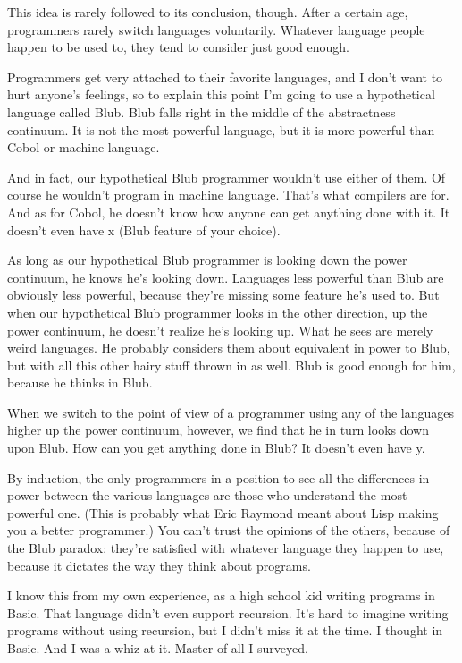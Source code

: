 \documentclass[10pt,twoside,openright]{memoir}
\begin{document}
This idea is rarely followed to its conclusion, though. After a certain age, programmers rarely switch languages voluntarily. Whatever language people happen to be used to, they tend to consider just good enough.

Programmers get very attached to their favorite languages, and I don't want to hurt anyone's feelings, so to explain this point I'm going to use a hypothetical language called Blub. Blub falls right in the middle of the abstractness continuum. It is not the most powerful language, but it is more powerful than Cobol or machine language.

And in fact, our hypothetical Blub programmer wouldn't use either of them. Of course he wouldn't program in machine language. That's what compilers are for. And as for Cobol, he doesn't know how anyone can get anything done with it. It doesn't even have x (Blub feature of your choice).

As long as our hypothetical Blub programmer is looking down the power continuum, he knows he's looking down. Languages less powerful than Blub are obviously less powerful, because they're missing some feature he's used to. But when our hypothetical Blub programmer looks in the other direction, up the power continuum, he doesn't realize he's looking up. What he sees are merely weird languages. He probably considers them about equivalent in power to Blub, but with all this other hairy stuff thrown in as well. Blub is good enough for him, because he thinks in Blub.

When we switch to the point of view of a programmer using any of the languages higher up the power continuum, however, we find that he in turn looks down upon Blub. How can you get anything done in Blub? It doesn't even have y.

By induction, the only programmers in a position to see all the differences in power between the various languages are those who understand the most powerful one. (This is probably what Eric Raymond meant about Lisp making you a better programmer.) You can't trust the opinions of the others, because of the Blub paradox: they're satisfied with whatever language they happen to use, because it dictates the way they think about programs.

I know this from my own experience, as a high school kid writing programs in Basic. That language didn't even support recursion. It's hard to imagine writing programs without using recursion, but I didn't miss it at the time. I thought in Basic. And I was a whiz at it. Master of all I surveyed.
\end{document}
